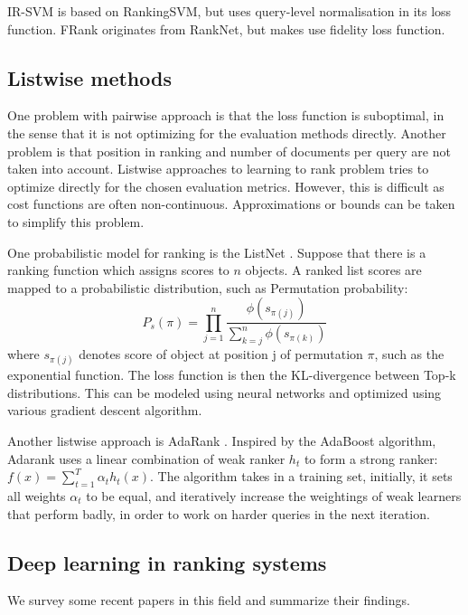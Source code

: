\documentclass[english]{article}
\theoremstyle{definition}
\begin{document}
\begin{multicols}{2}
IR-SVM is based on RankingSVM, but uses query-level normalisation in its loss function. FRank originates from RankNet, but makes use fidelity loss function.
\subsection{Listwise methods}

One problem with pairwise approach is that the loss function is suboptimal, in the sense that it is not optimizing for the evaluation methods directly. Another problem is that position in ranking and number of documents per query are not taken into account. Listwise approaches to learning to rank problem tries to optimize directly for the chosen evaluation metrics. However, this is difficult as cost functions are often non-continuous. Approximations or bounds can be taken to simplify this problem.

One probabilistic model for ranking is the ListNet \cite{cao2007learning}. Suppose that there is a ranking function which assigns scores to $n$ objects. A ranked list scores are mapped to a probabilistic distribution, such as Permutation probability:
$$P_s(\pi) = \prod_{j=1}^n \frac{\phi(s_{\pi(j)})}{\sum^n_{k=j} \phi(s_{\pi(k)})} $$
where $s_{\pi(j)}$ denotes score of object at position j of permutation $\pi$, such as the exponential function. The loss function is then the KL-divergence between Top-k distributions. This can be modeled using neural networks and optimized using various gradient descent algorithm.

Another listwise approach is AdaRank \cite{xu2007adarank}. Inspired by the AdaBoost algorithm, Adarank uses a linear combination of weak ranker $h_t$ to form a strong ranker: $f(x) = \sum^T_{t=1} \alpha_t h_t(x)$. The algorithm takes in a training set, initially, it sets all weights $\alpha_t$ to be equal, and iteratively increase the weightings of weak learners that perform badly, in order to work on harder queries in the next iteration. 

\subsection{Deep learning in ranking systems}

We survey some recent papers in this field and summarize their findings.


\end{multicols}
\end{document}
